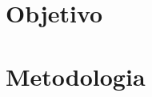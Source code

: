 \documentclass[10pt,twoside,a4paper]{article}
\begin{document}
\section{Objetivo}
\doublespacing


\section{Metodologia}
\doublespacing

\newpage
\end{document}
